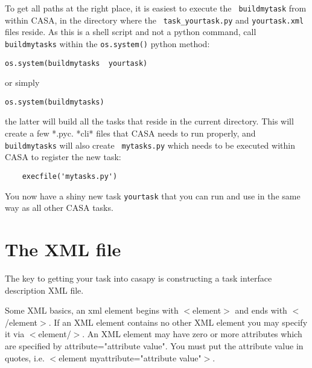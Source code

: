 To get all paths at the right place, it is easiest to execute the {\tt
  buildmytask} from within CASA, in the directory where the {\tt
  task\_yourtask.py} and {\tt yourtask.xml} files reside. As this is a
shell script and not a python command, call {\tt buildmytasks} within
the {\tt os.system()} python method:
\begin{verbatim}
os.system(buildmytasks  yourtask)
\end{verbatim}
or simply 
\begin{verbatim}
os.system(buildmytasks) 
\end{verbatim}
the latter will build all the tasks that reside in the current
directory. This will create a few *.pyc. *cli* files that CASA needs
to run properly, and {\tt buildmytasks} will also create {\tt
  mytasks.py} which needs to be executed within CASA to register the
new task:
\begin{verbatim}
    execfile('mytasks.py')
\end{verbatim}

You now have a shiny new task {\tt yourtask} that you can run and use
in the same way as all other CASA tasks. 




\section{The XML file}
\label{section:write.xml}

The key to getting your task into casapy is constructing a task
interface description XML file.

Some XML basics, an xml element begins with $<$element$>$ and ends
with $<$/element$>$. If an XML element contains no other XML element
you may specify it via $<$element/$>$. An XML element may have zero or
more attributes which are specified by attribute="attribute
value". You must put the attribute value in quotes, i.e. $<$element
myattribute="attribute value"$>$.

